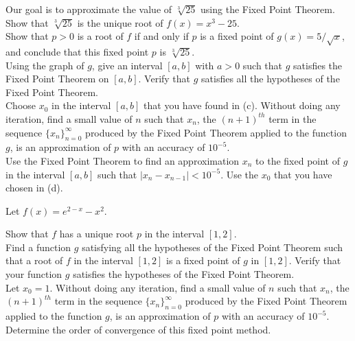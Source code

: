 \begin{question}
Our goal is to approximate the value of $\sqrt[3]{25}$ using the Fixed
Point Theorem.\\
 Show that $\sqrt[3]{25}$ is the unique root of $f(x) = x^3-25$.\\
 Show that $p>0$ is a root of $f$ if and only if $p$ is a
fixed point of $\displaystyle g(x) = 5/\sqrt{x}$, and conclude that
this fixed point $p$ is $\sqrt[3]{25}$. \\
 Using the graph of $g$, give an interval $[a,b]$ with $a>0$
such that $g$ satisfies the Fixed Point Theorem on $[a,b]$.  Verify
that $g$ satisfies all the hypotheses of the Fixed Point Theorem.\\
 Choose $x_0$ in the interval $[a,b]$ that you have found in (c).
Without doing any iteration, find a small value of $n$ such that $x_n$,
the $(n+1)^{th}$ term in the sequence $\{x_n\}_{n=0}^\infty$ produced by
the Fixed Point Theorem applied to the function $g$, is an approximation of 
$p$ with an accuracy of $10^{-5}$.\\ 
 Use the Fixed Point Theorem to find an approximation $x_n$ to
the fixed point of $g$ in the interval $[a,b]$ such that
$|x_n - x_{n-1}| < 10^{-5}$.  Use the $x_0$ that you have chosen in (d).
\label{solvAQ20}
\end{question}

\begin{question}
Let $f(x) = e^{2-x} -x^2$.

 Show that $f$ has a unique root $p$ in the interval $[1,2]$.\\
 Find a function $g$ satisfying all the hypotheses of the Fixed
Point Theorem such that a root of $f$ in the interval $[1,2]$ is a
fixed point of $g$ in $[1,2]$.  Verify that your function $g$ satisfies
the hypotheses of the Fixed Point Theorem.\\
 Let $x_0= 1$.  Without doing any iteration, find a small value
of $n$ such that $x_n$, the $(n+1)^{th}$ term in the sequence
$\{x_n\}_{n=0}^\infty$ produced by the Fixed Point Theorem applied to
the function $g$, is an approximation of $p$ with an accuracy of
$10^{-5}$.\\
 Determine the order of convergence of this fixed point
method.
\label{solvAQ21}
\end{question}



